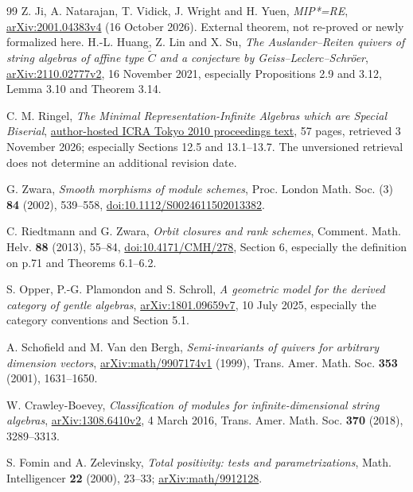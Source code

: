 \documentclass[11pt,oneside,openany]{book}
\theoremstyle{definition}\newtheorem{definition}[theorem]{Definition}
\theoremstyle{remark}\newtheorem{remark}[theorem]{Remark}
\begin{document}
\begin{thebibliography}{99}
 Z. Ji, A. Natarajan, T. Vidick, J. Wright and H. Yuen, \emph{MIP*=RE}, \href{https://arxiv.org/abs/2001.04383v4}{arXiv:2001.04383v4} (16 October 2026). External theorem, not re-proved or newly formalized here.
H.-L. Huang, Z. Lin and X. Su,
\emph{The Auslander--Reiten quivers of string algebras of affine type
$\widetilde C$ and a conjecture by Geiss--Leclerc--Schr\"oer},
\href{https://arxiv.org/abs/2110.02777v2}{arXiv:2110.02777v2},
16 November 2021, especially Propositions 2.9 and 3.12, Lemma 3.10 and Theorem 3.14.

C. M. Ringel, \emph{The Minimal Representation-Infinite Algebras which are Special Biserial},
\href{https://www.math.uni-bielefeld.de/~ringel/opus/tokyo.pdf}{author-hosted ICRA Tokyo 2010 proceedings text},
57 pages, retrieved 3 November 2026; especially Sections 12.5 and 13.1--13.7.
The unversioned retrieval does not determine an additional revision date.

G. Zwara, \emph{Smooth morphisms of module schemes},
Proc. London Math. Soc. (3) \textbf{84} (2002), 539--558,
\href{https://doi.org/10.1112/S0024611502013382}{doi:10.1112/S0024611502013382}.

C. Riedtmann and G. Zwara, \emph{Orbit closures and rank schemes},
Comment. Math. Helv. \textbf{88} (2013), 55--84,
\href{https://doi.org/10.4171/CMH/278}{doi:10.4171/CMH/278},
Section 6, especially the definition on p.71 and Theorems 6.1--6.2.

S. Opper, P.-G. Plamondon and S. Schroll,
\emph{A geometric model for the derived category of gentle algebras},
\href{https://arxiv.org/abs/1801.09659v7}{arXiv:1801.09659v7},
10 July 2025, especially the category conventions and Section 5.1.

A. Schofield and M. Van den Bergh,
\emph{Semi-invariants of quivers for arbitrary dimension vectors},
\href{https://arxiv.org/abs/math/9907174v1}{arXiv:math/9907174v1} (1999),
Trans. Amer. Math. Soc. \textbf{353} (2001), 1631--1650.

W. Crawley-Boevey, \emph{Classification of modules for infinite-dimensional string algebras},
\href{https://arxiv.org/abs/1308.6410v2}{arXiv:1308.6410v2}, 4 March 2016,
Trans. Amer. Math. Soc. \textbf{370} (2018), 3289--3313.

S. Fomin and A. Zelevinsky, \emph{Total positivity: tests and parametrizations},
Math. Intelligencer \textbf{22} (2000), 23--33;
\href{https://arxiv.org/abs/math/9912128}{arXiv:math/9912128}.


\end{thebibliography}
\end{document}
